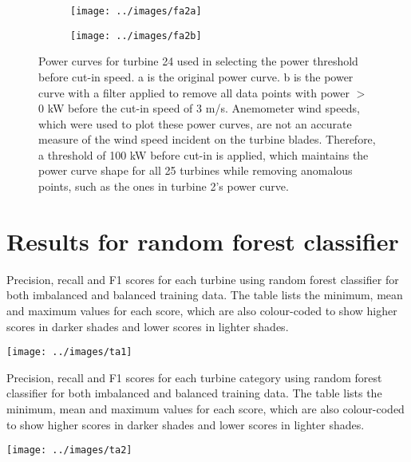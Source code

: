 \begin{figure}
  \centering
  \begin{subfigure}[t]{.5\textwidth}
    \centering
    \texttt{[image: ../images/fa2a]}
    \caption{}
  \end{subfigure}
  \begin{subfigure}[t]{.5\textwidth}
    \centering
    \texttt{[image: ../images/fa2b]}
    \caption{}
  \end{subfigure}
  \captionsetup{labelformat=empty,list=no}
  \caption{Power curves for turbine 24 used in selecting the power threshold before cut-in speed. a is the original power curve. b is the power curve with a filter applied to remove all data points with power $>$ 0 kW before the cut-in speed of 3 m/s. Anemometer wind speeds, which were used to plot these power curves, are not an accurate measure of the wind speed incident on the turbine blades. Therefore, a threshold of 100 kW before cut-in is applied, which maintains the power curve shape for all 25 turbines while removing anomalous points, such as the ones in turbine 2's power curve.}
\end{figure}

\chapter{Results for random forest classifier}\label{a3}

\begin{landscape}
  \begin{table}
    \centering
    \captionsetup{labelformat=empty,list=no}
    \caption{Precision, recall and F1 scores for each turbine using random forest classifier for both imbalanced and balanced training data. The table lists the minimum, mean and maximum values for each score, which are also colour-coded to show higher scores in darker shades and lower scores in lighter shades.}
    \texttt{[image: ../images/ta1]}
  \end{table}
\end{landscape}

\begin{table}
  \centering
  \captionsetup{labelformat=empty,list=no}
  \caption{Precision, recall and F1 scores for each turbine category using random forest classifier for both imbalanced and balanced training data. The table lists the minimum, mean and maximum values for each score, which are also colour-coded to show higher scores in darker shades and lower scores in lighter shades.}
  \texttt{[image: ../images/ta2]}
\end{table}

